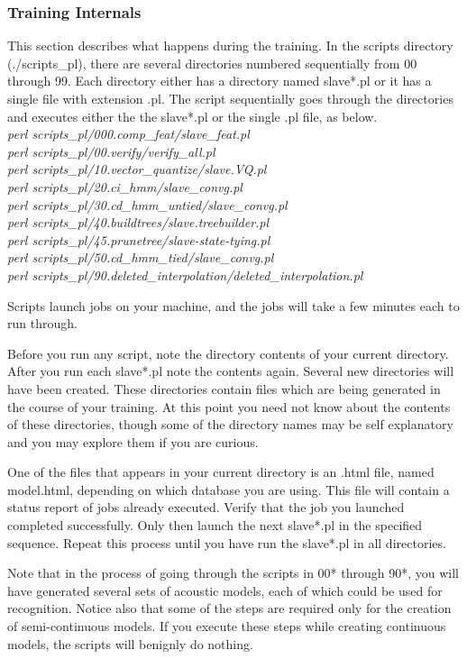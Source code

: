 \documentclass[12pt,a4paper,oldfontcommands]{memoir}
\begin{document}
\subsubsection{Training Internals}
This section describes what happens during the training. In the scripts directory (./scripts\_pl), there are several directories numbered sequentially from 00 through 99. Each directory either has a directory named slave*.pl or it has a single file with extension .pl. The script sequentially goes through the directories and executes either the the slave*.pl or the single .pl file, as below. \\
\textit{
perl scripts\_pl/000.comp\_feat/slave\_feat.pl\\
perl scripts\_pl/00.verify/verify\_all.pl\\
perl scripts\_pl/10.vector\_quantize/slave.VQ.pl\\
perl scripts\_pl/20.ci\_hmm/slave\_convg.pl\\
perl scripts\_pl/30.cd\_hmm\_untied/slave\_convg.pl\\
perl scripts\_pl/40.buildtrees/slave.treebuilder.pl\\
perl scripts\_pl/45.prunetree/slave-state-tying.pl\\
perl scripts\_pl/50.cd\_hmm\_tied/slave\_convg.pl\\
perl scripts\_pl/90.deleted\_interpolation/deleted\_interpolation.pl\\
}


 Scripts launch jobs on your machine, and the jobs will take a few minutes each to run through.

Before you run any script, note the directory contents of your current directory. After you run each slave*.pl note the contents again. Several new directories will have been created. These directories contain files which are being generated in the course of your training. At this point you need not know about the contents of these directories, though some of the directory names may be self explanatory and you may explore them if you are curious.

One of the files that appears in your current directory is an .html file, named model.html, depending on which database you are using. This file will contain a status report of jobs already executed. Verify that the job you launched completed successfully. Only then launch the next slave*.pl in the specified sequence. Repeat this process until you have run the slave*.pl in all directories.

Note that in the process of going through the scripts in 00* through 90*, you will have generated several sets of acoustic models, each of which could be used for recognition. Notice also that some of the steps are required only for the creation of semi-continuous models. If you execute these steps while creating continuous models, the scripts will benignly do nothing. 
\end{document}
